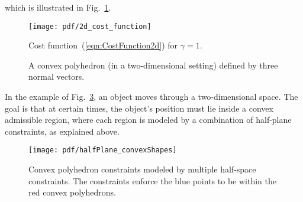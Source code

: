 \documentclass[conference]{IEEEtran}
\begin{document}
which is illustrated in Fig.~\ref{fig:2dCostFunction}.
%
\begin{figure}
\centering
\texttt{[image: pdf/2d\_cost\_function]}
\caption{Cost function~(\ref{eqn:CostFunction2d}) for $\gamma=1$.}
\label{fig:2dCostFunction}
\end{figure}
%
\begin{figure}
\centering
{}
  \caption{A convex polyhedron (in a two-dimensional setting) defined by three
  normal vectors.}
  \label{fig:ConvexShapeExplainedd}
\end{figure}

In the example of Fig.~\ref{fig:HalfPlaneConstraintConvexExample}, an object
moves through a two-dimensional space. The goal is that at certain times, the
object's position must lie inside a convex admissible region, where
each region is modeled by a combination of half-plane constraints, as explained
above.
%
\begin{figure}
\texttt{[image: pdf/halfPlane\_convexShapes]}
\caption{Convex polyhedron constraints modeled by multiple half-space
constraints. The constraints enforce the blue points to be within the red
convex polyhedrons.}
\label{fig:HalfPlaneConstraintConvexExample}
\end{figure}
\end{document}
